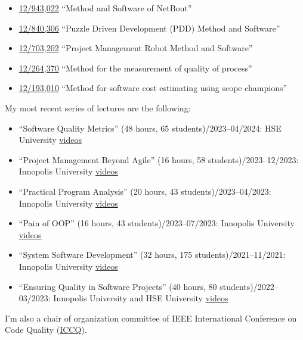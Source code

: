 \documentclass{./yb}
\begin{document}
\begin{itemize}
\setlength\itemsep{-.4em}
\item \href{https://patents.google.com/patent/US20120117164}{12/943,022}
``Method and Software of NetBout''
\item \href{https://patents.google.com/patent/US20120023476}{12/840,306}
``Puzzle Driven Development (PDD) Method and Software''
\item \href{https://patents.google.com/patent/US20110196798}{12/703,202}
``Project Management Robot Method and Software''
\item \href{https://patents.google.com/patent/US20100114638}{12/264,370}
``Method for the measurement of quality of process''
\item \href{https://patents.google.com/patent/US20100042968}{12/193,010}
``Method for software cost estimating using scope champions''
\end{itemize}

My most recent series of lectures are the following:

\begin{itemize}
\setlength\itemsep{-.4em}
\item ``Software Quality Metrics'' (48 hours, 65 students)/2023--04/2024: HSE University\newline
\href{https://www.youtube.com/playlist?list=PLaIsQH4uc08xyXRhhYPHh-Yam2kEwNaLl}{videos}
\item ``Project Management Beyond Agile'' (16 hours, 58 students)/2023--12/2023: Innopolis University\newline
\href{https://www.youtube.com/playlist?list=PLaIsQH4uc08x_T-Aelduv3Zf0DWRx40pq}{videos}
\item ``Practical Program Analysis'' (20 hours, 43 students)/2023--04/2023: Innopolis University\newline
\href{https://www.youtube.com/playlist?list=PLaIsQH4uc08wdXIC4utfgMxV_iswE9_Md}{videos}
\item ``Pain of OOP'' (16 hours, 43 students)/2023--07/2023: Innopolis University\newline
\href{https://www.youtube.com/playlist?list=PLaIsQH4uc08ytf8POIIAkkR4ZsRq8DFiV}{videos}
\item ``System Software Development'' (32 hours, 175 students)/2021--11/2021: Innopolis University\newline
\href{https://www.youtube.com/playlist?list=PLaIsQH4uc08woJKRAA7mmjs9fU0jeKjjM}{videos}
\item ``Ensuring Quality in Software Projects'' (40 hours, 80 students)/2022--03/2023: Innopolis University and HSE University\newline
\href{https://www.youtube.com/playlist?list=PLaIsQH4uc08y14wCJMeffS2yErN4QpB8m}{videos}
\end{itemize}

I'm also a chair of organization committee of
IEEE International Conference on Code Quality (\href{https://www.iccq.ru}{ICCQ}).
\end{document}
